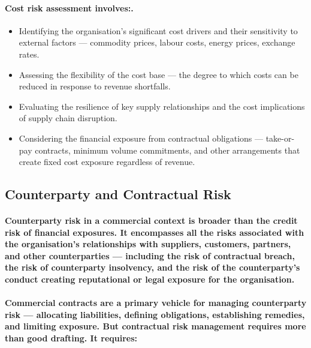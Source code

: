 \paragraph{Cost risk assessment involves:.}
\begin{itemize}
    \item{Identifying the organisation's significant cost drivers and their sensitivity to external factors — commodity prices, labour costs, energy prices, exchange rates.}
    \item{Assessing the flexibility of the cost base — the degree to which costs can be reduced in response to revenue shortfalls.}
    \item{Evaluating the resilience of key supply relationships and the cost implications of supply chain disruption.}
    \item{Considering the financial exposure from contractual obligations — take-or-pay contracts, minimum volume commitments, and other arrangements that create fixed cost exposure regardless of revenue.}
\end{itemize}

\subsection{Counterparty and Contractual Risk}
\paragraph{\textbf{Counterparty risk} in a commercial context is broader than the credit risk of financial exposures. It encompasses all the risks associated with the organisation's relationships with suppliers, customers, partners, and other counterparties — including the risk of contractual breach, the risk of counterparty insolvency, and the risk of the counterparty's conduct creating reputational or legal exposure for the organisation.}
\paragraph{Commercial contracts are a primary vehicle for managing counterparty risk — allocating liabilities, defining obligations, establishing remedies, and limiting exposure. But contractual risk management requires more than good drafting. It requires:}
\begin{itemize}
\end{itemize}
